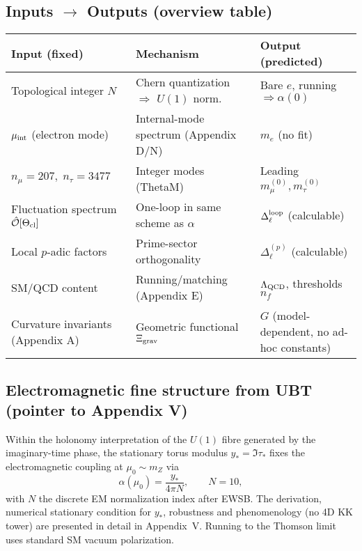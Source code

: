 \subsection{Inputs $\to$ Outputs (overview table)}
\begin{center}
\begin{tabular}{l l l}
\hline
\textbf{Input (fixed)} & \textbf{Mechanism} & \textbf{Output (predicted)}\\
\hline
Topological integer $N$ & Chern quantization $\Rightarrow$ $U(1)$ norm. & Bare $e$, running $\Rightarrow \alpha(0)$\\
$\mu_{\rm int}$ (electron mode) & Internal-mode spectrum (Appendix D/N) & $m_e$ (no fit)\\
$n_\mu=207,\; n_\tau=3477$ & Integer modes (ThetaM) & Leading $m_\mu^{(0)}, m_\tau^{(0)}$\\
Fluctuation spectrum $\hat{\mathcal O}[\Theta_{\rm cl}]$ & One-loop in same scheme as $\alpha$ & $\Delta_\ell^{\rm loop}$ (calculable)\\
Local $p$-adic factors & Prime-sector orthogonality & $\Delta_\ell^{(p)}$ (calculable)\\
SM/QCD content & Running/matching (Appendix E) & $\Lambda_{\rm QCD}$, thresholds $n_f$\\
Curvature invariants (Appendix A) & Geometric functional $\Xi_{\rm grav}$ & $G$ (model-dependent, no ad-hoc constants)\\
\hline
\end{tabular}
\end{center}



\subsection*{Electromagnetic fine structure from UBT (pointer to Appendix V)}
Within the holonomy interpretation of the $U(1)$ fibre generated by the imaginary-time phase,
the stationary torus modulus $y_*=\Im\tau_*$ fixes the electromagnetic coupling at $\mu_0\sim m_Z$ via
\[
\alpha(\mu_0)=\frac{y_*}{4\pi N},\qquad N=10,
\]
with $N$ the discrete EM normalization index after EWSB. The derivation, numerical stationary condition
for $y_*$, robustness and phenomenology (no 4D KK tower) are presented in detail in Appendix~V.
Running to the Thomson limit uses standard SM vacuum polarization.
